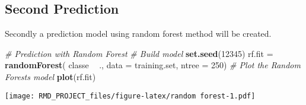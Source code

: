 \documentclass[]{article}
\newenvironment{Shaded}{\begin{snugshade}}{\end{snugshade}}
\newcommand{\CommentTok}[1]{\textcolor[rgb]{0.56,0.35,0.01}{\textit{#1}}}
\newcommand{\DataTypeTok}[1]{\textcolor[rgb]{0.13,0.29,0.53}{#1}}
\newcommand{\DecValTok}[1]{\textcolor[rgb]{0.00,0.00,0.81}{#1}}
\newcommand{\KeywordTok}[1]{\textcolor[rgb]{0.13,0.29,0.53}{\textbf{#1}}}
\newcommand{\NormalTok}[1]{#1}
\newcommand{\OperatorTok}[1]{\textcolor[rgb]{0.81,0.36,0.00}{\textbf{#1}}}
\newcommand{\StringTok}[1]{\textcolor[rgb]{0.31,0.60,0.02}{#1}}
\begin{document}
\hypertarget{second-prediction}{%
\subsection{Second Prediction}\label{second-prediction}}

Secondly a prediction model using random forest method will be created.

\begin{Shaded}
\begin{Highlighting}[]
\CommentTok{# Prediction with Random Forest}
\CommentTok{# Build model}
\KeywordTok{set.seed}\NormalTok{(}\DecValTok{12345}\NormalTok{)}
\NormalTok{rf.fit =}\StringTok{ }\KeywordTok{randomForest}\NormalTok{(}
\NormalTok{  classe }\OperatorTok{~}\StringTok{ }\NormalTok{.,}
  \DataTypeTok{data =}\NormalTok{ training.set,}
  \DataTypeTok{ntree =} \DecValTok{250}\NormalTok{)}
\CommentTok{# Plot the Random Forests model}
\KeywordTok{plot}\NormalTok{(rf.fit)}
\end{Highlighting}
\end{Shaded}

\texttt{[image: RMD\_PROJECT\_files/figure-latex/random forest-1.pdf]}

\begin{Shaded}
\end{Shaded}
\end{document}
